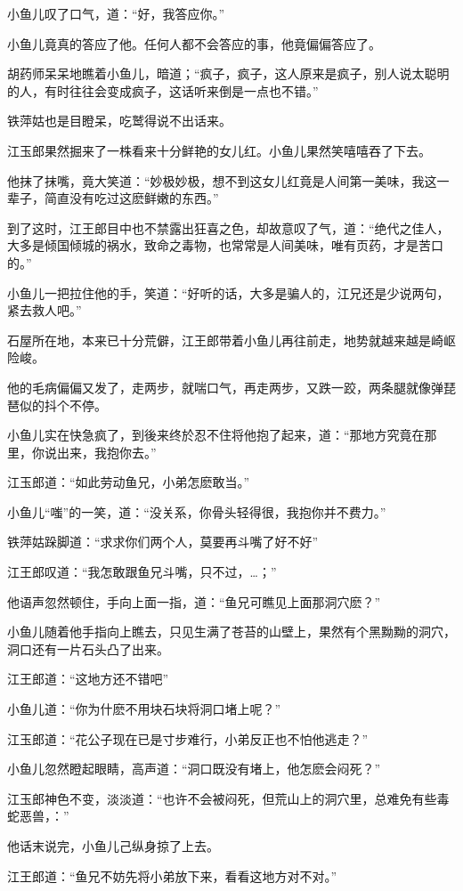 \documentclass[12pt,oneside]{book}
\begin{document}
小鱼儿叹了口气，道：``好，我答应你。''

小鱼儿竟真的答应了他。任何人都不会答应的事，他竟偏偏答应了。

胡药师呆呆地瞧着小鱼儿，暗道；``疯子，疯子，这人原来是疯子，别人说太聪明的人，有时往往会变成疯子，这话听来倒是一点也不错。''

铁萍姑也是目瞪呆，吃鹫得说不出话来。

江玉郎果然掘来了一株看来十分鲜艳的女儿红。小鱼儿果然笑嘻嘻吞了下去。

他抹了抹嘴，竟大笑道：``妙极妙极，想不到这女儿红竟是人间第一美味，我这一辈子，简直没有吃过这麽鲜嫩的东西。''

到了这时，江王郎目中也不禁露出狂喜之色，却故意叹了气，道：``绝代之佳人，大多是倾国倾城的祸水，致命之毒物，也常常是人间美味，唯有页药，才是苦口的。''

小鱼儿一把拉住他的手，笑道：``好听的话，大多是骗人的，江兄还是少说两句，紧去救人吧。''

石屋所在地，本来已十分荒僻，江王郎带着小鱼儿再往前走，地势就越来越是崎岖险峻。

他的毛病偏偏又发了，走两步，就喘口气，再走两步，又跌一跤，两条腿就像弹琵琶似的抖个不停。

小鱼儿实在快急疯了，到後来终於忍不住将他抱了起来，道：``那地方究竟在那里，你说出来，我抱你去。''

江玉郎道：``如此劳动鱼兄，小弟怎麽敢当。''

小鱼儿``嗤''的一笑，道：``没关系，你骨头轻得很，我抱你并不费力。''

铁萍姑跺脚道：``求求你们两个人，莫要再斗嘴了好不好''

江王郎叹道：``我怎敢跟鱼兄斗嘴，只不过，\ldots；''

他语声忽然顿住，手向上面一指，道：``鱼兄可瞧见上面那洞穴麽？''

小鱼儿随着他手指向上瞧去，只见生满了苍苔的山壁上，果然有个黑黝黝的洞穴，洞口还有一片石头凸了出来。

江王郎道：``这地方还不错吧''

小鱼儿道：``你为什麽不用块石块将洞口堵上呢？''

江玉郎道：``花公子现在已是寸步难行，小弟反正也不怕他逃走？''

小鱼儿忽然瞪起眼睛，高声道：``洞口既没有堵上，他怎麽会闷死？''

江玉郎神色不变，淡淡道：``也许不会被闷死，但荒山上的洞穴里，总难免有些毒蛇恶兽，：''

他话末说完，小鱼儿己纵身掠了上去。

江王郎道：``鱼兄不妨先将小弟放下来，看看这地方对不对。''
\end{document}
